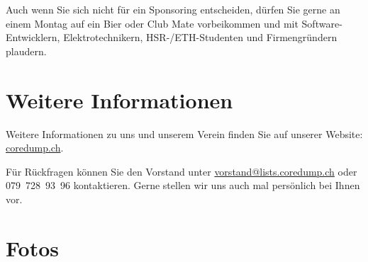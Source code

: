 \documentclass[10pt,a4paper,parskip,fleqn]{scrartcl}
\begin{document}
Auch wenn Sie sich nicht für ein Sponsoring entscheiden, dürfen Sie gerne an
einem Montag auf ein Bier oder Club Mate vorbeikommen und mit
Software-Entwicklern, Elektrotechnikern, HSR-/ETH-Studenten und Firmengründern
plaudern.

\newpage
\section{Weitere Informationen}

Weitere Informationen zu uns und unserem Verein finden Sie auf unserer Website:
\url{coredump.ch}.

Für Rückfragen können Sie den Vorstand unter \url{vorstand@lists.coredump.ch}
oder 079~728~93~96 kontaktieren. Gerne stellen wir uns auch mal persönlich bei
Ihnen vor.

\section{Fotos}
\end{document}
